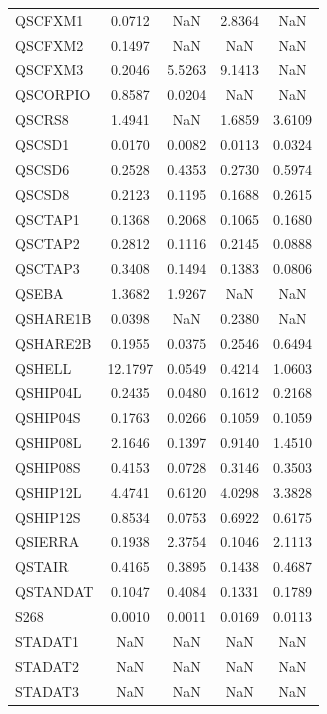 \begin{longtable}{lcccc}
QSCFXM1  &   0.0712 &      NaN &   2.8364 &      NaN \\
QSCFXM2  &   0.1497 &      NaN &      NaN &      NaN \\
QSCFXM3  &   0.2046 &   5.5263 &   9.1413 &      NaN \\
QSCORPIO &   0.8587 &   0.0204 &      NaN &      NaN \\
QSCRS8   &   1.4941 &      NaN &   1.6859 &   3.6109 \\
QSCSD1   &   0.0170 &   0.0082 &   0.0113 &   0.0324 \\
QSCSD6   &   0.2528 &   0.4353 &   0.2730 &   0.5974 \\
QSCSD8   &   0.2123 &   0.1195 &   0.1688 &   0.2615 \\
QSCTAP1  &   0.1368 &   0.2068 &   0.1065 &   0.1680 \\
QSCTAP2  &   0.2812 &   0.1116 &   0.2145 &   0.0888 \\
QSCTAP3  &   0.3408 &   0.1494 &   0.1383 &   0.0806 \\
QSEBA    &   1.3682 &   1.9267 &      NaN &      NaN \\
QSHARE1B &   0.0398 &      NaN &   0.2380 &      NaN \\
QSHARE2B &   0.1955 &   0.0375 &   0.2546 &   0.6494 \\
QSHELL   &  12.1797 &   0.0549 &   0.4214 &   1.0603 \\
QSHIP04L &   0.2435 &   0.0480 &   0.1612 &   0.2168 \\
QSHIP04S &   0.1763 &   0.0266 &   0.1059 &   0.1059 \\
QSHIP08L &   2.1646 &   0.1397 &   0.9140 &   1.4510 \\
QSHIP08S &   0.4153 &   0.0728 &   0.3146 &   0.3503 \\
QSHIP12L &   4.4741 &   0.6120 &   4.0298 &   3.3828 \\
QSHIP12S &   0.8534 &   0.0753 &   0.6922 &   0.6175 \\
QSIERRA  &   0.1938 &   2.3754 &   0.1046 &   2.1113 \\
QSTAIR   &   0.4165 &   0.3895 &   0.1438 &   0.4687 \\
QSTANDAT &   0.1047 &   0.4084 &   0.1331 &   0.1789 \\
S268     &   0.0010 &   0.0011 &   0.0169 &   0.0113 \\
STADAT1  &      NaN &      NaN &      NaN &      NaN \\
STADAT2  &      NaN &      NaN &      NaN &      NaN \\
STADAT3  &      NaN &      NaN &      NaN &      NaN \\

\end{longtable}
